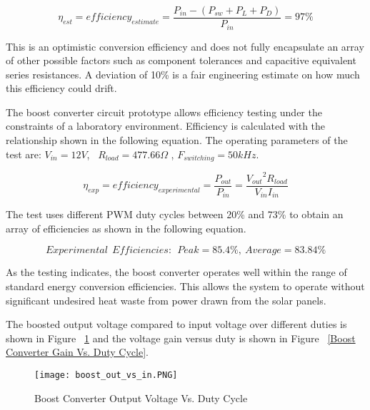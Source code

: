 \begin{equation}
\eta_{est} = efficiency_{estimate} = \frac{P_{in} - {(P_{sw}+P_L+P_D)}}{P_{in}} = 97\%
\end{equation}


This is an optimistic conversion efficiency and does not fully encapsulate an array of other possible factors such as component tolerances and capacitive equivalent series resistances. A deviation of 10\% is a fair engineering estimate on how much this efficiency could drift.

The boost converter circuit prototype allows efficiency testing under the constraints of a laboratory environment. Efficiency is calculated with the relationship shown in the following equation. The operating parameters of the test are: $V_{in} = 12V$,~ $R_{load} = 477.66\Omega$ , $F_{switching} = 50 kHz$. 

\begin{equation}
\eta_{exp} = efficiency_{experimental} = \frac{P_{out}}{P_{in}} = \frac{{V_{out}}^2{R_{load}}}{{V_{in}}{I_{in}}}
\end{equation}

The test uses different PWM duty cycles between 20\% and 73\% to obtain an array of efficiencies as shown in the following equation.

\begin{equation}
Experimental~~ Efficiencies:  ~~  Peak = 85.4\%, ~ Average = 83.84\% 
\end{equation}

As the testing indicates, the boost converter operates well within the range of standard energy conversion efficiencies. This allows the system to operate without significant undesired heat waste from power drawn from the solar panels.

The boosted output voltage compared to input voltage over different duties is shown in Figure ~\ref{Boost Converter Output Voltage Vs. Duty Cycle} and the voltage gain versus duty is shown in Figure ~\ref{Boost Converter Gain Vs. Duty Cycle}.

\begin{figure}
\centering
\texttt{[image: boost\_out\_vs\_in.PNG]}
\caption{Boost Converter Output Voltage Vs. Duty Cycle}
\label{Boost Converter Output Voltage Vs. Duty Cycle}
\end{figure}

